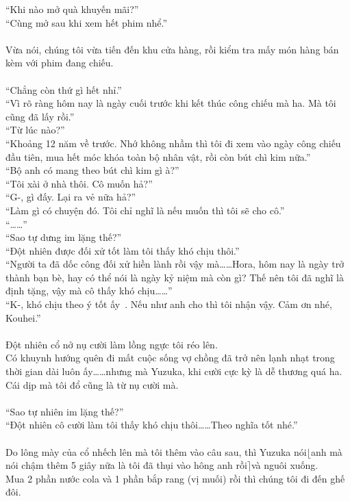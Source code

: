 \documentclass[12pt,a4paper, twosides]{book}
\begin{document}
“Khi nào mở quà khuyến mãi?”\\
“Cùng mở sau khi xem hết phim nhể.”\\
\\
Vừa nói, chúng tôi vừa tiến đến khu cửa hàng, rồi kiểm tra mấy món hàng bán kèm với phim đang chiếu.\\
\\
“Chẳng còn thứ gì hết nhỉ.”\\
“Vì rõ ràng hôm nay là ngày cuối trước khi kết thúc công chiếu mà ha. Mà tôi cũng đã lấy rồi.”\\
“Từ lúc nào?”\\
“Khoảng 12 năm về trước. Nhớ không nhầm thì tôi đi xem vào ngày công chiếu đầu tiên, mua hết móc khóa toàn bộ nhân vật, rồi còn bút chì kim nữa.”\\
“Bộ anh có mang theo bút chì kim gì à?”\\
“Tôi xài ở nhà thôi. Cô muốn hả?”\\
“G-, gì đấy. Lại ra vẻ nữa hả?”\\
“Làm gì có chuyện đó. Tôi chỉ nghĩ là nếu muốn thì tôi sẽ cho cô.”\\
“……”\\
“Sao tự dưng im lặng thế?”\\
“Đột nhiên được đối xử tốt làm tôi thấy khó chịu thôi.”\\
“Người ta đã dốc công đối xử hiền lành rồi vậy mà……Hora, hôm nay là ngày trở thành bạn bè, hay có thể nói là ngày kỷ niệm mà còn gì? Thế nên tôi đã nghĩ là định tặng, vậy mà cô thấy khó chịu……”\\
“K-, khó chịu theo ý tốt ấy~. Nếu như anh cho thì tôi nhận vậy. Cảm ơn nhé, Kouhei.”\\
\\
Đột nhiên cổ nở nụ cười làm lồng ngực tôi réo lên.\\
Có khuynh hướng quên đi mất cuộc sống vợ chồng đã trở nên lạnh nhạt trong thời gian dài luôn ấy……nhưng mà Yuzuka, khi cười cực kỳ là dễ thương quá ha. Cái dịp mà tôi đổ cũng là từ nụ cười mà.\\
\\
“Sao tự nhiên im lặng thế?”\\
“Đột nhiên cô cười làm tôi thấy khó chịu thôi……Theo nghĩa tốt nhé.”\\
\\
Do lông mày của cổ nhếch lên mà tôi thêm vào câu sau, thì Yuzuka nói$\lfloor$anh mà nói chậm thêm 5 giây nữa là tôi đã thụi vào hông anh rồi$\rceil$và nguôi xuống.\\
Mua 2 phần nước cola và 1 phần bắp rang (vị muối) rồi thì chúng tôi đi đến ghế đôi.\\
\end{document}

